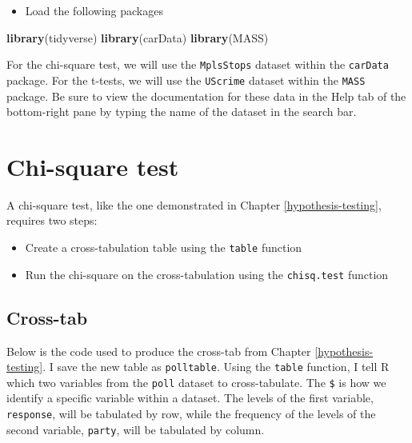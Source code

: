 \documentclass[
]{book}
\makeatletter
\newenvironment{Shaded}{\begin{snugshade}}{\end{snugshade}}
\newcommand{\FunctionTok}[1]{\textcolor[rgb]{0.27,0.27,0.27}{\textbf{#1}}}
\newcommand{\NormalTok}[1]{#1}
\providecommand{\tightlist}{%
  \setlength{\itemsep}{0pt}\setlength{\parskip}{0pt}}
\newenvironment{kframe}{%
\medskip{}
\setlength{\fboxsep}{.8em}
 \def\at@end@of@kframe{}%
 \ifinner\ifhmode%
  \def\at@end@of@kframe{\end{minipage}}%
  \begin{minipage}{\columnwidth}%
 \fi\fi%
 \def\FrameCommand##1{\hskip\@totalleftmargin \hskip-\fboxsep
 \colorbox{shadecolor}{##1}\hskip-\fboxsep
     \hskip-\linewidth \hskip-\@totalleftmargin \hskip\columnwidth}%
 \MakeFramed {\advance\hsize-\width
   \@totalleftmargin\z@ \linewidth\hsize
   \@setminipage}}%
 {\par\unskip\endMakeFramed%
 \at@end@of@kframe}
\renewenvironment{Shaded}{\begin{kframe}}{\end{kframe}}
\makeatother
\begin{document}
\begin{itemize}
\tightlist
\item
  Load the following packages
\end{itemize}

\begin{Shaded}
\begin{Highlighting}[]
\FunctionTok{library}\NormalTok{(tidyverse)}
\FunctionTok{library}\NormalTok{(carData)}
\FunctionTok{library}\NormalTok{(MASS)}
\end{Highlighting}
\end{Shaded}

For the chi-square test, we will use the \texttt{MplsStops} dataset within the \texttt{carData} package. For the t-tests, we will use the \texttt{UScrime} dataset within the \texttt{MASS} package. Be sure to view the documentation for these data in the Help tab of the bottom-right pane by typing the name of the dataset in the search bar.

\hypertarget{chi-square-test-1}{%
\section{Chi-square test}\label{chi-square-test-1}}

A chi-square test, like the one demonstrated in Chapter \ref{hypothesis-testing}, requires two steps:

\begin{itemize}
\tightlist
\item
  Create a cross-tabulation table using the \texttt{table} function
\item
  Run the chi-square on the cross-tabulation using the \texttt{chisq.test} function
\end{itemize}

\hypertarget{cross-tab}{%
\subsection{Cross-tab}\label{cross-tab}}

Below is the code used to produce the cross-tab from Chapter \ref{hypothesis-testing}. I save the new table as \texttt{polltable}. Using the \texttt{table} function, I tell R which two variables from the \texttt{poll} dataset to cross-tabulate. The \texttt{\$} is how we identify a specific variable within a dataset. The levels of the first variable, \texttt{response}, will be tabulated by row, while the frequency of the levels of the second variable, \texttt{party}, will be tabulated by column.
\end{document}
